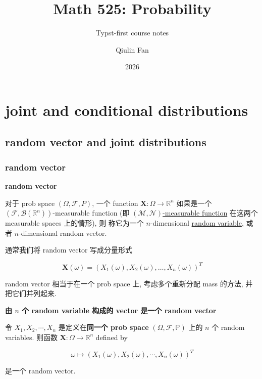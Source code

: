 \documentclass{qlnotes-export}
\title{Math 525: Probability}
\subtitle{Typst-first course notes}
\author{Qiulin Fan}
\date{2026}
\begin{document}
\mainmatter
\chapter{joint and conditional distributions}\label{joint-and-conditional-distributions}

\section{random vector and joint distributions}\label{random-vector-and-joint-distributions}

\subsection{random vector}\label{random-vector}

\begin{definition}{\protect{}\label{kn-random-vector}{\textbf{random vector}}}

对于 prob space \((\Omega,\mathcal{F},P)\), 一个 function \(\mathbf{X}:\Omega\rightarrow{\mathbb{R}}^{n}\) 如果是一个 \((\mathcal{F},\mathcal{B}({\mathbb{R}}^{n}))\)-measurable function (即 \href{https://qiulinfan.github.io/notes/math/measure-theory/\#kn-mathcal-m-mathcal-n-measurable-function}{\((\mathcal{M},\mathcal{N})\)-measurable function} 在这两个 measurable spaces 上的情形), 则 称它为一个 \(n\)-dimensional \href{https://qiulinfan.github.io/notes/math/probability/\#kn-random-variable}{random variable}, 或者 \(n\)-dimensional random vector.

通常我们将 random vector 写成分量形式

\[\mathbf{X}(\omega) = (X_{1}(\omega),X_{2}(\omega),\ldots,X_{n}(\omega))^{T}\]

\end{definition}

random vector 相当于在一个 prob space 上, 考虑多个重新分配 mass 的方法, 并把它们并列起来.

\begin{proposition}{\protect{}\label{kn-n-random-variable-vector-random-vector}{\textbf{由
\(n\) 个 random variable 构成的 vector 是一个 random vector}}}

令 \(X_{1},X_{2},\cdots,X_{n}\) 是定义在\textbf{同一个 prob space} \((\Omega,\mathcal{F},{\mathbb{P}})\) 上的 \(n\) 个 random variables. 则函数 \(\mathbf{X}:\Omega\rightarrow{\mathbb{R}}^{n}\) defined by

\[\omega\mapsto(X_{1}(\omega),X_{2}(\omega),\cdots,X_{n}(\omega))^{T}\]

是一个 random vector.

\end{proposition}
\end{document}
